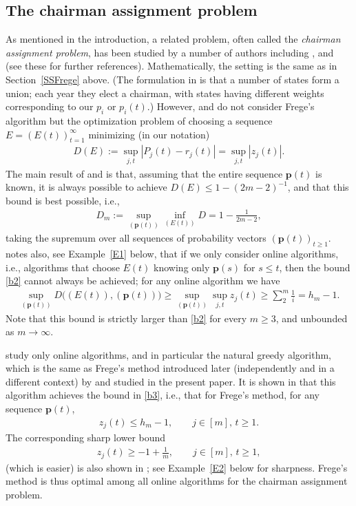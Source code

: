 \documentclass[11pt,reqno,tbtags,a4paper]{amsart}
\numberwithin{equation}{section}
\renewcommand\le{\leq}
\renewcommand\ge{\geq}
\renewcommand\leq{\leqslant}
\renewcommand\geq{\geqslant}
\theoremstyle{plain}%
\theoremstyle{definition}
\theoremstyle{remark}
\newcommand{\refSS}[1]{Section~\ref{#1}}
\newcommand{\refE}[1]{Example~\ref{#1}}
\newcommand\mtoo{\ensuremath{{m\to\infty}}}
\newcommand\qw{^{-1}}
\newcommand\vp{\mathbf{p}}
\newcommand\0{{\boldsymbol 0}}
\newcommand\1{{\boldsymbol 1}}
\begin{document}
\subsection{The chairman assignment problem}\label{SSChair}
As mentioned in the introduction,
a related problem, often called the 
\emph{chairman assignment problem}, has been studied by a number of authors
including \citet{Meijer73}, \citet{Tijdeman80} and \citet{Coppersmith} 
(see these for further references). 
Mathematically,
the setting is the same as in \refSS{SSFrege} above. 
(The formulation in \cite{Tijdeman80} is that a number of states
form a union; each year they elect a chairman, with states having
different weights corresponding to our $p_i$ or $p_i(t)$.)
However, \cite{Meijer73} and \cite{Tijdeman80}
do not consider Frege's algorithm 
but the optimization problem of choosing a sequence $E=(E(t))_{t=1}^\infty$
minimizing (in our notation) 
\begin{align}\label{b1}
D(E):=  \sup_{j,t}|P_j(t)-r_j(t)|
=
  \sup_{j,t}|z_j(t)|.
\end{align}
The main result of \cite{Meijer73} and \cite{Tijdeman80} is that, 
assuming that the entire sequence $\vp(t)$ is known, 
it is always possible to achieve
$D(E) \le 1-(2m-2)\qw$, and that this bound is best possible,
i.e., 
\begin{align}\label{b2}
D_m:=\sup_{(\vp(t))} \inf_{(E(t))}D=1-\frac{1}{2m-2},
\end{align}
taking the supremum
over all sequences of probability vectors $(\vp(t))_{t\ge1}$.
%
\citet{Tijdeman80} notes also, see \refE{E1} below,
that if we only consider online algorithms,
i.e., algorithms that choose $E(t)$ knowing only $\vp(s)$ for $s\le t$,
then the bound \eqref{b2} cannot always be achieved; 
for any online algorithm we have
\begin{align}\label{b3}
\sup_{(\vp(t))}D\bigl((E(t)),(\vp(t))\bigr)
\ge\sup_{(\vp(t))} 
\sup_{j,t} z_j(t)
\ge \sum_{2}^m \frac{1}{i}=h_m-1.
\end{align}
Note that this bound is strictly larger than \eqref{b2} for every $m\ge3$, 
and unbounded as \mtoo.

\citet{Coppersmith} study only online algorithms, and in particular the
natural greedy algorithm, which  is the same as  Frege's method
introduced later (independently and in a different context) 
by \cite{HLL} and studied in the present paper.
It is shown in \cite{Coppersmith}  that this algorithm achieves the bound in
\eqref{b3}, i.e., that for 
Frege's method, for any sequence $\vp(t)$,
\begin{align}\label{b4<}
z_j(t)\le h_m-1,
\qquad j\in[m],\,t\ge1.
\end{align}
The corresponding sharp lower bound 
\begin{align}\label{b4>}
z_j(t)\ge -1+\frac1m,
\qquad  j\in[m],\,t\ge1,
\end{align}
(which is easier) 
is also shown in \cite{Coppersmith};  see \refE{E2} below for sharpness.
%
Frege's method is thus optimal among all online algorithms for the
chairman assignment problem.
\end{document}
